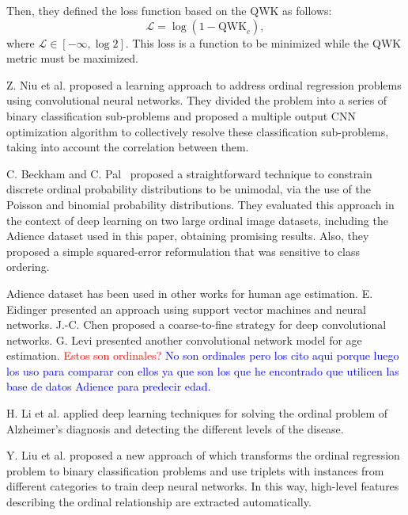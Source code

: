\documentclass[journal]{IEEEtran}
\begin{document}
	Then, they defined the loss function based on the QWK as follows:
	\begin{equation}
	\mathscr{L} = \log(1 - \text{QWK}_c),
	\end{equation}
	where $\mathscr{L} \in [-\infty, \log 2]$. This loss is a function to be minimized while the QWK metric must be maximized.
	
	Z. Niu et al. \cite{niu2016ordinal} proposed a learning approach to address ordinal regression problems using convolutional neural networks. They divided the problem into a series of binary classification sub-problems and proposed a multiple output CNN optimization algorithm to collectively resolve these classification sub-problems, taking into account the correlation between them.
	
	C. Beckham and C. Pal~\cite{beckham2017unimodal} proposed a straightforward technique to constrain discrete ordinal probability distributions to be unimodal, via the use of the Poisson and binomial probability distributions. They evaluated this approach in the context of deep learning on two large ordinal image datasets, including the Adience dataset used in this paper, obtaining promising results.	Also, they proposed a simple squared-error reformulation \cite{beckham2016simple} that was sensitive to class ordering.
	
	Adience dataset has been used in other works for human age estimation. E. Eidinger \cite{eidinger2014age} presented an approach using support vector machines and neural networks. J.-C. Chen \cite{chen2016cascaded} proposed a coarse-to-fine strategy for deep convolutional networks. G. Levi \cite{levi2015age} presented another convolutional network model for age estimation. \textcolor{red}{Estos son ordinales?} \textcolor{blue}{No son ordinales pero los cito aqui porque luego los uso para comparar con ellos ya que son los que he encontrado que utilicen las base de datos Adience para predecir edad.}
	
	H. Li et al. \cite{li2017deep} applied deep learning techniques for solving the ordinal problem of Alzheimer's diagnosis and detecting the different levels of the disease.
	
	Y. Liu et al. \cite{liu2017deep} proposed a new approach of which transforms the ordinal regression problem to binary classification problems and use triplets with instances from different categories to train deep neural networks. In this way, high-level features describing the ordinal relationship are extracted automatically.
	
\end{document}
